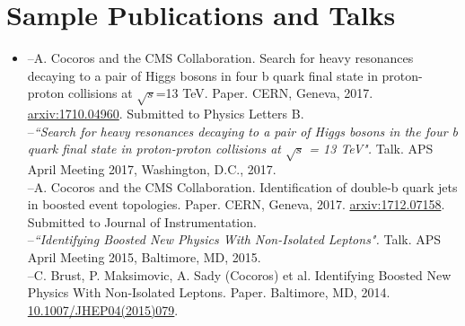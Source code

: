 \section*{ Sample Publications and Talks}
\begin{itemize}
\item{--A. Cocoros and the CMS Collaboration. Search for heavy resonances decaying to a pair of Higgs bosons in four b quark final state in proton-proton collisions at $\sqrt{s}$=13 TeV. Paper. CERN, Geneva, 2017. \href{https://arxiv.org/abs/1710.04960}{arxiv:1710.04960}. Submitted to Physics Letters B.\\
--\textit{``Search for heavy resonances decaying to a pair of Higgs bosons in the four b quark final state in proton-proton collisions at $\sqrt{s}$ = 13 TeV".} Talk. APS April Meeting 2017, Washington, D.C., 2017.\\
--A. Cocoros and the CMS Collaboration. Identification of double-b quark jets in boosted event topologies. Paper. CERN, Geneva, 2017. \href{https://arxiv.org/abs/1712.07158}{arxiv:1712.07158}. Submitted to Journal of Instrumentation.\\
--\textit{``Identifying Boosted New Physics With Non-Isolated Leptons".} Talk. APS April Meeting 2015, Baltimore, MD, 2015.\\
--C. Brust, P. Maksimovic, A. Sady (Cocoros) et al. Identifying Boosted New Physics With Non-Isolated Leptons. Paper. Baltimore, MD, 2014. \href{https://link.springer.com/article/10.1007\%2FJHEP04\%282015\%29079}{10.1007/JHEP04(2015)079}. \\
}
\end{itemize}
